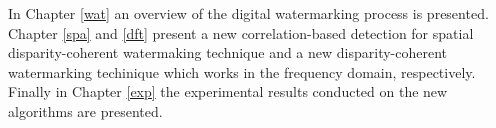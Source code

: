 In Chapter \ref{wat} an overview of the digital watermarking process is presented.\\
Chapter \ref{spa} and \ref{dft} present a new correlation-based detection for spatial disparity-coherent watermaking technique and a new disparity-coherent watermarking techinique which works in the frequency domain, respectively.\\
Finally in Chapter \ref{exp} the experimental results conducted on the new algorithms are presented.\\


